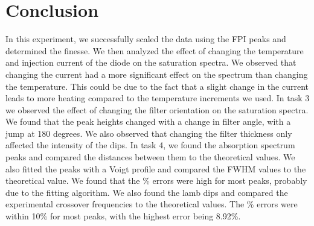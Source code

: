 \documentclass{article}
\begin{document}
\pagebreak{}

\section{Conclusion}

In this experiment, we successfully scaled the data using the FPI peaks and determined the finesse. We then analyzed the effect of changing the temperature and injection current of the diode on the saturation spectra. We observed that changing the current had a more significant effect on the spectrum than changing the temperature. This could be due to the fact that a slight change in the current leads to more heating compared to the temperature increments we used. 
In task 3 we observed the effect of changing the filter orientation on the saturation spectra. We found that the peak heights changed with a change in filter angle, with a jump at 180 degrees. We also observed that changing the filter thickness only affected the intensity of the dips.
In task 4, we found the absorption spectrum peaks and compared the distances between them to the theoretical values. We also fitted the peaks with a Voigt profile and compared the FWHM values to the theoretical value. We found that the \% errors were high for most peaks, probably due to the fitting algorithm. We also found the lamb dips and compared the experimental crossover frequencies to the theoretical values. The \% errors were within 10\% for most peaks, with the highest error being 8.92\%.

\pagebreak{}
\end{document}
